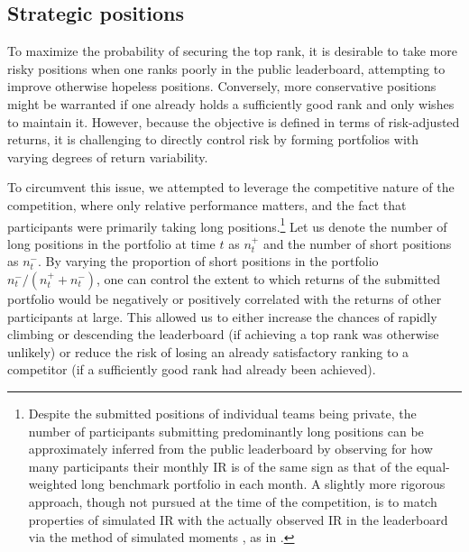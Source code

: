\documentclass[3p,times,twocolumn]{elsarticle}
\begin{document}
\subsection{Strategic positions}\label{subsection:strategic}

To maximize the probability of securing the top rank, it is desirable to take more risky positions when one ranks poorly in the public leaderboard, attempting to improve otherwise hopeless positions.
Conversely, more conservative positions might be warranted if one already holds a sufficiently good rank and only wishes to maintain it.
However, because the objective is defined in terms of risk-adjusted returns, it is challenging to directly control risk by forming portfolios with varying degrees of return variability.

To circumvent this issue, we attempted to leverage the competitive nature of the competition, where only relative performance matters, and the fact that participants were primarily taking long positions.\footnote{
    Despite the submitted positions of individual teams being private, the number of participants submitting predominantly long positions can be approximately inferred from the public leaderboard by observing for how many participants their monthly IR is of the same sign as that of the equal-weighted long benchmark portfolio in each month.
    A slightly more rigorous approach, though not pursued at the time of the competition, is to match properties of simulated IR with the actually observed IR in the leaderboard via the method of simulated moments \citep{mcfaddenMethodSimulatedMoments1989}, as in \citet{stanekNoteM6Forecasting2023a}.
}
Let us denote the number of long positions in the portfolio at time $t$ as $n^{+}_{t}$ and the number of short positions as $n^{-}_{t}$.
By varying the proportion of short positions in the portfolio $n^{-}_{t}/(n^{+}_{t}+n^{-}_{t})$, one can control the extent to which returns of the submitted portfolio would be negatively or positively correlated with the returns of other participants at large.
This allowed us to either increase the chances of rapidly climbing or descending the leaderboard (if achieving a top rank was otherwise unlikely) or reduce the risk of losing an already satisfactory ranking to a competitor (if a sufficiently good rank had already been achieved).
\end{document}
